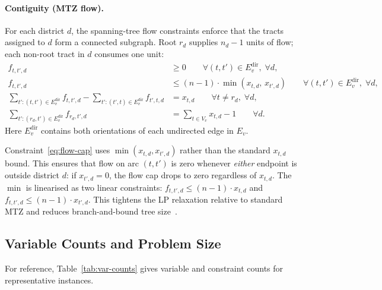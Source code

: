 \paragraph{Contiguity (MTZ flow).}
For each district $d$, the spanning-tree flow constraints enforce that
the tracts assigned to $d$ form a connected subgraph.
Root $r_d$ supplies $n_d - 1$ units of flow; each non-root tract in $d$
consumes one unit:
\begin{align}
f_{t,t',d} &\geq 0
  \qquad \forall (t,t') \in E_v^{\mathrm{dir}},\; \forall d,
  \label{eq:flow-nonneg} \\
f_{t,t',d} &\leq (n-1) \cdot \min(x_{t,d},\, x_{t',d})
  \qquad \forall (t,t') \in E_v^{\mathrm{dir}},\; \forall d,
  \label{eq:flow-cap} \\
\sum_{t': (t,t') \in E_v^{\mathrm{dir}}} f_{t,t',d}
  - \sum_{t': (t',t) \in E_v^{\mathrm{dir}}} f_{t',t,d}
  &= x_{t,d}
  \qquad \forall t \neq r_d,\; \forall d,
  \label{eq:flow-balance} \\
\sum_{t': (r_d,t') \in E_v^{\mathrm{dir}}} f_{r_d,t',d}
  &= \sum_{t \in V_v} x_{t,d} - 1
  \qquad \forall d.
  \label{eq:flow-root}
\end{align}
Here $E_v^{\mathrm{dir}}$ contains both orientations of each undirected
edge in $E_v$.

\begin{remark}
Constraint~\eqref{eq:flow-cap} uses $\min(x_{t,d}, x_{t',d})$ rather
than the standard $x_{t,d}$ bound.
This ensures that flow on arc $(t, t')$ is zero whenever \emph{either}
endpoint is outside district $d$: if $x_{t',d} = 0$, the flow cap
drops to zero regardless of $x_{t,d}$.
The $\min$ is linearised as two linear constraints:
$f_{t,t',d} \leq (n-1) \cdot x_{t,d}$ and
$f_{t,t',d} \leq (n-1) \cdot x_{t',d}$.
This tightens the LP relaxation relative to standard MTZ and reduces
branch-and-bound tree size~\citep{gurnee2021}.
\end{remark}

\subsection{Variable Counts and Problem Size}

For reference, Table~\ref{tab:var-counts} gives variable and constraint
counts for representative instances.

